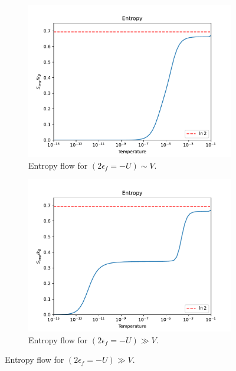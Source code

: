 \begin{figure}
  \centering
  \begin{subfigure}[b]{0.4\linewidth}
    \centering
    \includegraphics[width=\linewidth]{./gfx/results/s_lowU.pdf}
    \caption{Entropy flow for $(2\epsilon_f = -U) \sim V$.}
    \label{fig:5-results-s-lowu}
  \end{subfigure}
  \begin{subfigure}[b]{0.4\linewidth}
    \centering
    \includegraphics[width=\linewidth]{./gfx/results/s.pdf}
    \caption{Entropy flow for $(2\epsilon_f = -U) \gg V$.}
    \label{fig:5-results-s}
  \end{subfigure}
\end{figure}

